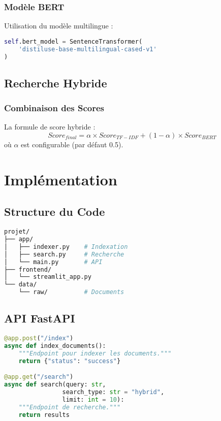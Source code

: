 \documentclass[12pt,a4paper]{article}
\begin{document}
\subsubsection{Modèle BERT}
Utilisation du modèle multilingue :
\begin{lstlisting}[language=Python]
self.bert_model = SentenceTransformer(
    'distiluse-base-multilingual-cased-v1'
)
\end{lstlisting}

\subsection{Recherche Hybride}
\subsubsection{Combinaison des Scores}
La formule de score hybride :
\begin{equation}
    Score_{final} = \alpha \times Score_{TF-IDF} + (1-\alpha) \times Score_{BERT}
\end{equation}
où $\alpha$ est configurable (par défaut 0.5).

\section{Implémentation}

\subsection{Structure du Code}
\begin{lstlisting}[language=bash]
projet/
├── app/
│   ├── indexer.py    # Indexation
│   ├── search.py     # Recherche
│   └── main.py       # API
├── frontend/
│   └── streamlit_app.py
└── data/
    └── raw/          # Documents
\end{lstlisting}

\subsection{API FastAPI}
\begin{lstlisting}[language=Python, caption=Endpoints principaux]
@app.post("/index")
async def index_documents():
    """Endpoint pour indexer les documents."""
    return {"status": "success"}

@app.get("/search")
async def search(query: str, 
                search_type: str = "hybrid",
                limit: int = 10):
    """Endpoint de recherche."""
    return results
\end{lstlisting}
\end{document}
